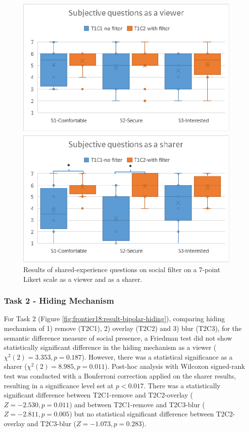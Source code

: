 \begin{figure}[ht]
    \begin{center}
    \includegraphics[width=.8\linewidth]{images/54-hiding-frontier18/images-14.eps}
    \caption{Results of shared-experience questions on social filter on a 7-point Likert scale as a viewer and as a sharer.}
    \label{fig:frontier18:result-shared-experience-questions-filter}
    \end{center}
\end{figure}

\subsubsection{Task 2 - Hiding Mechanism}

For Task 2 (Figure \ref{fig:frontier18:result-bipolar-hiding}), comparing hiding mechanism of 1) remove (T2C1), 2) overlay (T2C2) and 3) blur (T2C3), for the semantic difference measure of social presence, a Friedman test did not show statistically significant difference in the hiding mechanism as a viewer ($\chi^2(2)=3.353, p=0.187$). However, there was a statistical significance as a sharer ($\chi^2(2)=8.985, p=0.011$). Post-hoc analysis with Wilcoxon signed-rank test was conducted with a Bonferroni correction applied on the sharer results, resulting in a significance level set at $p<0.017$. There was a statistically significant difference between T2C1-remove and T2C2-overlay ($Z=-2.530, p=0.011$) and between T2C1-remove and T2C3-blur ($Z=-2.811, p=0.005$) but no statistical significant difference between T2C2-overlay and T2C3-blur ($Z=-1.073, p=0.283$).

